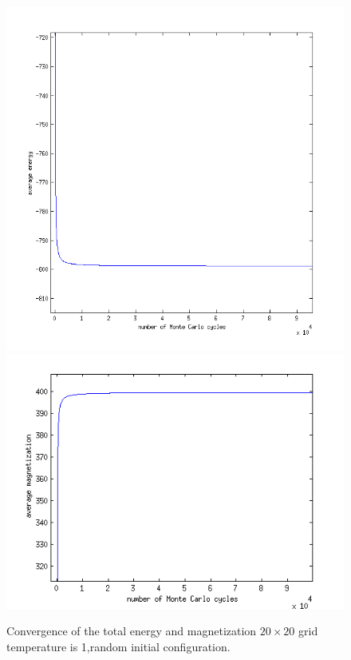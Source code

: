 \documentclass[a4paper,english, 10pt, twoside]{article}
\begin{document}
\begin{figure}[H]
 \includegraphics[scale=0.5]{energy_random_temp1_zoom.png}
 \includegraphics[scale=0.6]{magnetization_random_temp1_zoom}
 \caption{Convergence of the total energy and magnetization $20 \times 20$ grid temperature is 1,random initial configuration.}
\label{energy_random_temp1}
 \end{figure}
\end{document}
